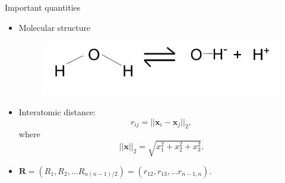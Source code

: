 \documentclass{beamer}
\begin{document}
%

\begin{frame}{Important quantities}
    \begin{itemize}
        \item Molecular structure
        \begin{figure}[htbp]
            \centering
            \includegraphics[scale=0.3]{img/slide/molecular_structure.png}
            \label{fig:h2o}
        \end{figure}
        \item Interatomic distance:
        \begin{equation}
            r_{ij} = ||\mathbf{x}_i - \mathbf{x}_j||_2,
        \end{equation}
        where
        \begin{equation}
            ||\mathbf{x}||_2 = \sqrt{x_1^2 + x_2^2 + x_3^2}.
        \end{equation}
        \item $\mathbf{R} = (R_1, R_2, ... R_{n(n-1)/2}) = (r_{12}, r_{13},...r_{n-1,n})$.
    \end{itemize}
\end{frame}
\end{document}
